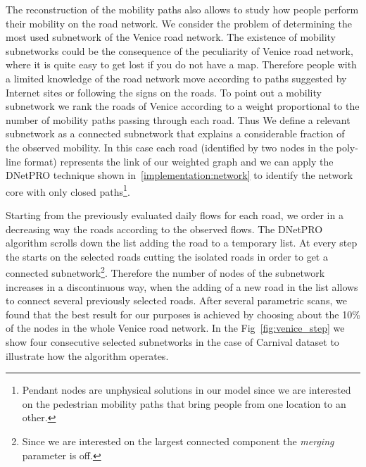 \documentclass{standalone}
\begin{document}
The reconstruction of the mobility paths also allows to study how people perform their mobility on the road network.
We consider the problem of determining the most used subnetwork of the Venice road network.
The existence of mobility subnetworks could be the consequence of the peculiarity of Venice road network, where it is quite easy to get lost
if you do not have a map.
Therefore people with a limited knowledge of the road network move according to paths suggested by Internet sites or following the signs on the roads.
To point out a mobility subnetwork we rank the roads of Venice according to a weight proportional to the number of mobility paths passing through each road.
Thus We define a relevant subnetwork as a connected subnetwork that explains a considerable fraction of the observed mobility.
In this case each road (identified by two nodes in the poly-line format) represents the link of our weighted graph and we can apply the DNetPRO technique shown in~\ref{implementation:network} to identify the network core with only closed paths\footnote{
  Pendant nodes are unphysical solutions in our model since we are interested on the pedestrian mobility paths that bring people from one location to an other.
}.


Starting from the previously evaluated daily flows for each road, we order in a decreasing way the roads according to the observed
flows.
The DNetPRO algorithm scrolls down the list adding the road to a temporary list.
At every step the  starts on the selected roads cutting the isolated roads in order to get a connected subnetwork\footnote{
  Since we are interested on the largest connected component the \emph{merging} parameter is off.
}.
Therefore the number of nodes of the subnetwork increases in a discontinuous way, when the adding of a new road in the list allows to
connect several previously selected roads.
After several parametric scans, we found that the best result for our purposes is achieved by choosing about the 10\% of the nodes in the whole Venice road network.
In the Fig~\ref{fig:venice_step} we show four consecutive selected subnetworks in the case of Carnival dataset to illustrate how the algorithm operates.
\end{document}
